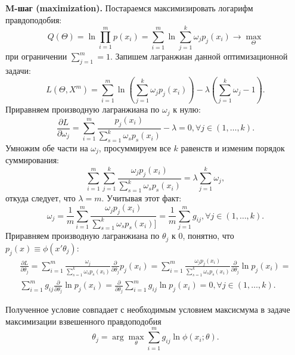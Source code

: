 \documentclass[12pt,a4paper]{report}
\begin{document}
\textbf{M-шаг (maximization).}
Постараемся максимизировать логарифм правдоподобия:
\begin{equation*}
Q(\Theta) = \ln \prod_{i=1}^{m}p(x_i) = \sum_{i=1}^{m}\ln \sum_{j=1}^{k} \omega_jp_j(x_i) \to \max_{\Theta}
\end{equation*}
при ограничении $\sum_{j=1}^{m} = 1$. Запишем лагранжиан данной оптимизационной задачи:
\begin{equation*}
L(\Theta, X^m) = \sum_{i=1}^{m}\ln (\sum_{j=1}^{k}\omega_jp_j(x_i)) - \lambda(\sum_{j=1}^{k}\omega_j - 1).
\end{equation*}
Приравняем производную лагранжиана по $\omega_j$ к нулю:
\begin{equation*}
\frac{\partial L}{\partial \omega_j} = \sum_{i=1}^{m} \frac{p_j(x_i)}{\sum_{s=1}^{k}\omega_sp_s(x_i)} -\lambda = 0, \forall j \in (1, \dots, k).
\end{equation*}
Умножим обе части на $\omega_j$, просуммируем все $k$ равенств и изменим порядок суммирования:
\begin{equation*}
\sum_{i=1}^{m}\sum_{j=1}^{k}\frac{\omega_jp_j(x_i)}{\sum_{s=1}^{k}\omega_sp_s(x_i)} = \lambda \sum_{j=1}^{k}\omega_j,
\end{equation*}
откуда следует, что $\lambda = m$. Учитывая этот факт:
\begin{equation*}
\omega_j = \frac{1}{m} \sum_{i=1}^{m}\frac{\omega_jp_j(x_i)}{\sum_{s=1}^{k}\omega_sp_s(x_i)]} = \frac{1}{m}\sum_{j=1}^m g_{ij}, \forall j \in (1, \dots, k).
\end{equation*}
Приравняем производную лагранжиана по $\theta_j$ к 0, понятно, что $p_j(x) \equiv \phi(x' \theta_j)$:
\begin{eqnarray}
\frac{\partial L}{\partial \theta_j} = \sum_{i=1}^{m} \frac{\omega_j}{\sum_{s=1}^{k}\omega_sp_s(x_i)} \frac{\partial }{\partial \theta_j} p_j(x_i) = 
\sum_{i=1}^{m} \frac{\omega_j p_j(x_i)}{\sum_{s=1}^{k}\omega_sp_s(x_i)} \frac{\partial }{\partial \theta_j} \ln p_j(x_i) = \\
\sum_{i=1}^{m}g_{ij} \frac{\partial }{\partial \theta_j} \ln p_j(x_i) = \frac{\partial }{\partial \theta_j} \sum_{i=1}^{m}g_{ij}  \ln p_j(x_i) = 0, \forall j \in (1, \dots, k).
\end{eqnarray}

Полученное условие совпадает с необходимым условием максисмума в задаче максимизации взвешенного правдоподобия
\begin{equation*}
\theta_j = \arg \max_{\theta} \sum_{i=1}^{m}g_{ij}  \ln\phi(x_i; \theta).
\end{equation*}
\end{document}
